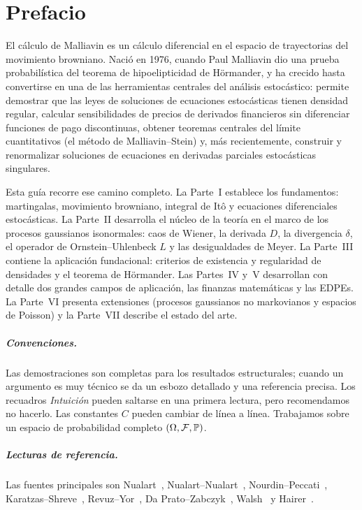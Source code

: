 \chapter*{Prefacio}

El cálculo de Malliavin es un cálculo diferencial en el espacio de trayectorias del movimiento
browniano. Nació en 1976, cuando Paul Malliavin dio una prueba probabilística del teorema
de hipoelipticidad de Hörmander, y ha crecido hasta convertirse en una de las herramientas
centrales del análisis estocástico: permite demostrar que las leyes de soluciones de ecuaciones
estocásticas tienen densidad regular, calcular sensibilidades de precios de derivados financieros
sin diferenciar funciones de pago discontinuas, obtener teoremas centrales del límite cuantitativos
(el método de Malliavin--Stein) y, más recientemente, construir y renormalizar soluciones de
ecuaciones en derivadas parciales estocásticas singulares.

Esta guía recorre ese camino completo. La Parte~I establece los fundamentos: martingalas,
movimiento browniano, integral de Itô y ecuaciones diferenciales estocásticas. La Parte~II
desarrolla el núcleo de la teoría en el marco de los procesos gaussianos isonormales: caos de
Wiener, la derivada $D$, la divergencia $\delta$, el operador de Ornstein--Uhlenbeck $L$ y las desigualdades
de Meyer. La Parte~III contiene la aplicación fundacional: criterios de existencia y regularidad
de densidades y el teorema de Hörmander. Las Partes~IV y~V desarrollan con detalle dos
grandes campos de aplicación, las finanzas matemáticas y las EDPEs. La Parte~VI presenta
extensiones (procesos gaussianos no markovianos y espacios de Poisson) y la Parte~VII describe
el estado del arte.

\paragraph{Convenciones.} Las demostraciones son completas para los resultados estructurales; cuando
un argumento es muy técnico se da un esbozo detallado y una referencia precisa. Los recuadros
\emph{Intuición} pueden saltarse en una primera lectura, pero recomendamos no hacerlo. Las constantes
$C$ pueden cambiar de línea a línea. Trabajamos sobre un espacio de probabilidad completo
$(\Omega,\mathcal{F},\mathbb{P})$.

\paragraph{Lecturas de referencia.} Las fuentes principales son Nualart~\cite{Nualart06}, Nualart--Nualart~\cite{NualartNualart18},
Nourdin--Peccati~\cite{NourdinPeccati12}, Karatzas--Shreve~\cite{KaratzasShreve91}, Revuz--Yor~\cite{RevuzYor99}, Da Prato--Zabczyk~\cite{DaPratoZabczyk14}, Walsh~\cite{Walsh86}
y Hairer~\cite{Hairer11}.
